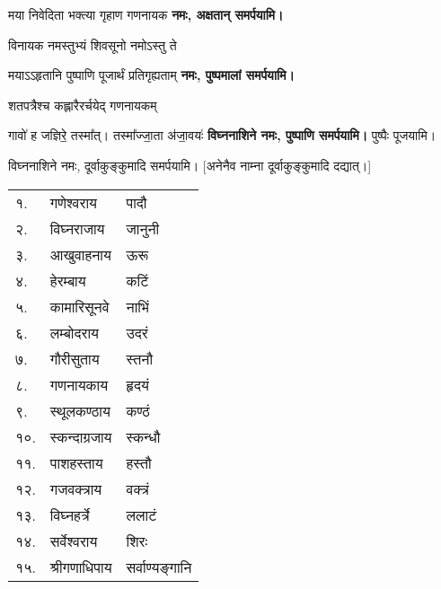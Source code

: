 \begin{center}
{मया निवेदिता भक्त्या गृहाण गणनायक}
\textbf{\devAya{} नमः, अक्षतान् समर्पयामि।}
\medskip

{विनायक नमस्तुभ्यं शिवसूनो नमोऽस्तु ते\footnotemark[\value{footnote}]}

{मयाऽऽहृतानि पुष्पाणि पूजार्थं प्रतिगृह्यताम्}
\textbf{\devAya{} नमः, पुष्पमालां समर्पयामि।}

{शतपत्रैश्च कह्लारैरर्चयेद् गणनायकम्}

{गावो॑ ह जज्ञिरे॒ तस्मा᳚त्। तस्मा᳚ज्जा॒ता अ॑जा॒वयः॑}
\textbf{विघ्ननाशिने नमः, पुष्पाणि समर्पयामि।} पुष्पैः पूजयामि।

विघ्ननाशिने नमः, दूर्वाकुङ्कुमादि समर्पयामि। 
[अनेनैव नाम्ना दूर्वाकुङ्कुमादि दद्यात्।]

\begin{longtable}{ll@{~नमः — }l@{~पूजयामि}}
    १. & गणेश्वराय  & पादौ\\
    २. & विघ्नराजाय  & जानुनी\\
    ३. & आखुवाहनाय  & ऊरू\\
    ४. & हेरम्बाय  & कटिं\\
    ५. & कामारिसूनवे  & नाभिं\\
    ६. & लम्बोदराय  & उदरं\\
    ७. & गौरीसुताय  & स्तनौ\\
    ८. & गणनायकाय  & हृदयं\\
    ९. & स्थूलकण्ठाय  & कण्ठं\\
    १०. & स्कन्दाग्रजाय  & स्कन्धौ\\
    ११. & पाशहस्ताय  & हस्तौ\\
    १२. & गजवक्त्राय  & वक्त्रं\\
    १३. & विघ्नहर्त्रे  & ललाटं\\
    १४. & सर्वेश्वराय  & शिरः\\
    १५. & श्रीगणाधिपाय  & सर्वाण्यङ्गानि\\
\end{longtable}


\end{center}
